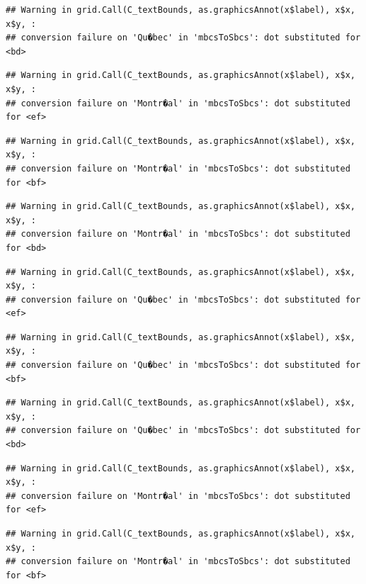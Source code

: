 \documentclass[]{article}
\begin{document}
\begin{verbatim}
## Warning in grid.Call(C_textBounds, as.graphicsAnnot(x$label), x$x, x$y, :
## conversion failure on 'Qu�bec' in 'mbcsToSbcs': dot substituted for <bd>
\end{verbatim}

\begin{verbatim}
## Warning in grid.Call(C_textBounds, as.graphicsAnnot(x$label), x$x, x$y, :
## conversion failure on 'Montr�al' in 'mbcsToSbcs': dot substituted for <ef>
\end{verbatim}

\begin{verbatim}
## Warning in grid.Call(C_textBounds, as.graphicsAnnot(x$label), x$x, x$y, :
## conversion failure on 'Montr�al' in 'mbcsToSbcs': dot substituted for <bf>
\end{verbatim}

\begin{verbatim}
## Warning in grid.Call(C_textBounds, as.graphicsAnnot(x$label), x$x, x$y, :
## conversion failure on 'Montr�al' in 'mbcsToSbcs': dot substituted for <bd>
\end{verbatim}

\begin{verbatim}
## Warning in grid.Call(C_textBounds, as.graphicsAnnot(x$label), x$x, x$y, :
## conversion failure on 'Qu�bec' in 'mbcsToSbcs': dot substituted for <ef>
\end{verbatim}

\begin{verbatim}
## Warning in grid.Call(C_textBounds, as.graphicsAnnot(x$label), x$x, x$y, :
## conversion failure on 'Qu�bec' in 'mbcsToSbcs': dot substituted for <bf>
\end{verbatim}

\begin{verbatim}
## Warning in grid.Call(C_textBounds, as.graphicsAnnot(x$label), x$x, x$y, :
## conversion failure on 'Qu�bec' in 'mbcsToSbcs': dot substituted for <bd>
\end{verbatim}

\begin{verbatim}
## Warning in grid.Call(C_textBounds, as.graphicsAnnot(x$label), x$x, x$y, :
## conversion failure on 'Montr�al' in 'mbcsToSbcs': dot substituted for <ef>
\end{verbatim}

\begin{verbatim}
## Warning in grid.Call(C_textBounds, as.graphicsAnnot(x$label), x$x, x$y, :
## conversion failure on 'Montr�al' in 'mbcsToSbcs': dot substituted for <bf>
\end{verbatim}
\end{document}
